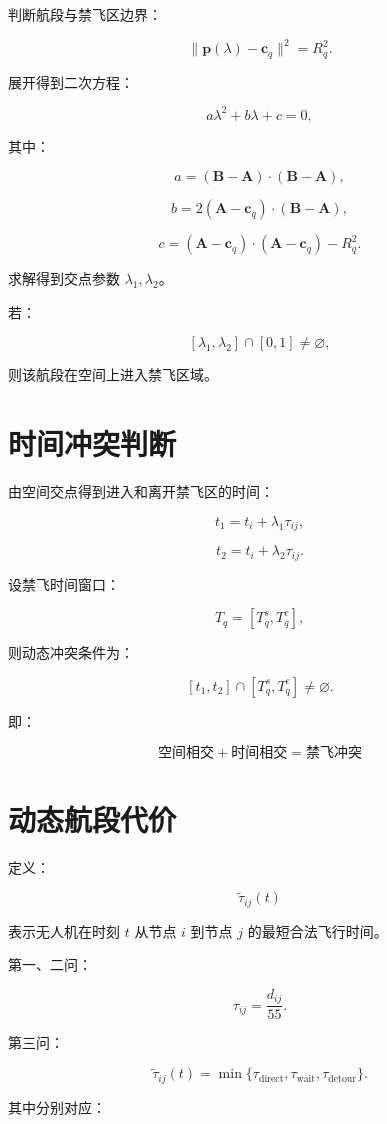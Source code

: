 \documentclass[UTF8]{ctexart}
\begin{document}
判断航段与禁飞区边界：

\[
\|\bm p(\lambda)-\bm c_q\|^2=R_q^2.
\]

展开得到二次方程：

\[
a\lambda^2+b\lambda+c=0,
\]

其中：

\[
a=(\bm B-\bm A)\cdot(\bm B-\bm A),
\]

\[
b=2(\bm A-\bm c_q)\cdot(\bm B-\bm A),
\]

\[
c=(\bm A-\bm c_q)\cdot(\bm A-\bm c_q)-R_q^2.
\]

求解得到交点参数
$\lambda_1,\lambda_2$。

若：

\[
[\lambda_1,\lambda_2]\cap[0,1]\neq\varnothing,
\]

则该航段在空间上进入禁飞区域。

\section{时间冲突判断}

由空间交点得到进入和离开禁飞区的时间：

\[
t_1=t_i+\lambda_1\tau_{ij},
\]

\[
t_2=t_i+\lambda_2\tau_{ij}.
\]

设禁飞时间窗口：

\[
T_q=[T_q^{s},T_q^{e}],
\]

则动态冲突条件为：

\[
[t_1,t_2]\cap[T_q^s,T_q^e]\neq\varnothing.
\]

即：

\[
\boxed{
\text{空间相交}
+
\text{时间相交}
=
\text{禁飞冲突}
}
\]

\section{动态航段代价}

定义：

\[
\widetilde{\tau}_{ij}(t)
\]

表示无人机在时刻 $t$ 从节点 $i$ 到节点 $j$
的最短合法飞行时间。

第一、二问：

\[
\tau_{ij}=\frac{d_{ij}}{55}.
\]

第三问：

\[
\widetilde{\tau}_{ij}(t)
=
\min
\{
\tau_{\mathrm{direct}},
\tau_{\mathrm{wait}},
\tau_{\mathrm{detour}}
\}.
\]

其中分别对应：
\end{document}
